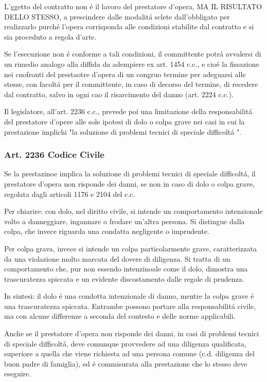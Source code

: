 \documentclass{article}
\begin{document}
L'ggetto del contratto non \'e il lavoro del prestatore d'opera, MA IL RISULTATO DELLO STESSO, a prescindere dalle modalit\'a sclete dall'obbligato per realizzarlo purch\'e l'opera corrisponda alle condizioni stabilite dal contratto e si sia proceduto a regola d'arte. 

Se l'esecuzione non \'e conforme a tali condizioni, il committente potr\'a avvalersi di un rimedio analogo alla diffida da adempiere ex art. 1454 c.c., e cio\'e la fissazione nei cnofronti del prestaotre d'opera di un congruo termine per adeguarsi alle stesse, con facolt\'a per il committente, in caso di decorso del termine, di recedere dal contratto, salvo in ogni cao il risarcimento del danno (art. 2224 c.c.).

Il legislatore, all'art. 2236 c.c., prevede poi una limitazione della responsabilit\'a del prestatore d'opere alle sole ipotesi di dolo o colpa grave nei casi in cui la prestazione implichi "la soluzione di problemi tecnici di speciale difficolt\'a ".

\subsubsection{Art. 2236 Codice Civile}
Se la prestazinoe implica la soluzione di problemi tecnici di speciale difficolt\'a, il prestatore d'opera non risponde dei danni, se non in caso di dolo o colpa grave, regolata dagli articoli 1176 e 2104 del c.c.

Per chiarire: con dolo, nel diritto civile, si intende un comportamento intenzionale volto a danneggiare, ingannare o frodare un'altra persona. Si distingue dalla colpa, che invece riguarda una condatta negligente o imprudente.

Per colpa grava, invece si intende un colpa particolarmente grave, caratterizzata da una violazione molto marcata del dovere di diligenza. Si tratta di un comportamento che, pur non essendo intenzinoale come il dolo, dimostra una trascuratezza spiccata e un evidente discostamento dalle regole di prudenza.

In sintesi: il dolo \'e una condotta intenzionale di danno, mentre la colpa grave \'e una trascuratezza spiccata. Entrambe possono portare alla responsabilit\'a civile, ma con alcune differenze a seconda del contesto e delle norme applicabili.

Anche se il prestatore d'opera non risponde dei danni, in casi di problemi tecnici di speciale difficolt\'a, deve comunque provvedere ad una diligenza qualificata, superiore a quella che viene richiesta ad una persona comune (c.d. diligenza del buon padre di famiglia), ed \'e commisurata alla prestazione che lo stesso deve eseguire. 
\end{document}
